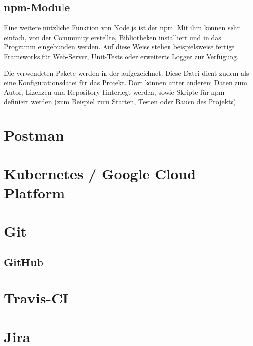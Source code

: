 \subsection{npm-Module}
Eine weitere nützliche Funktion von Node.js ist der \ac{npm}. Mit ihm können sehr einfach, von der Community erstellte, Bibliotheken installiert und in das Programm eingebunden werden. Auf diese Weise stehen beispielsweise fertige Frameworks für Web-Server, Unit-Tests oder erweiterte Logger zur Verfügung.

Die verwendeten Pakete werden in der  aufgezeichnet. Diese Datei dient zudem als eine Konfigurationsdatei für das Projekt. Dort können unter anderem Daten zum Autor, Lizenzen und Repository hinterlegt werden, sowie Skripte für npm definiert werden (zum Beispiel zum Starten, Testen oder Bauen des Projekts).

\section{Postman}

\section{Kubernetes / Google Cloud Platform}

\section{Git}
\subsection{GitHub}

\section{Travis-CI}

\section{Jira}